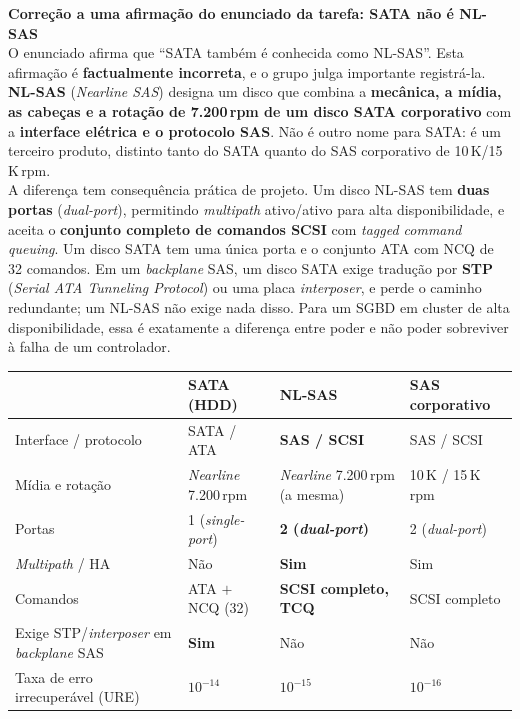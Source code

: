 \documentclass[11pt,a4paper]{article}
\newcommand{\correcao}[2]{%
  \begin{center}\begin{minipage}{0.96\textwidth}
  \colorbox{fundo}{\begin{minipage}{\dimexpr\linewidth-2\fboxsep}
  \vspace{3pt}\textbf{\color{laranja}#1}\\[2pt]\small #2\vspace{4pt}
  \end{minipage}}\end{minipage}\end{center}}
\begin{document}
\correcao{Correção a uma afirmação do enunciado da tarefa: SATA \textbf{não} é NL-SAS}{%
O enunciado afirma que ``SATA também é conhecida como NL-SAS''. Esta afirmação é
\textbf{factualmente incorreta}, e o grupo julga importante registrá-la.\\[4pt]
\textbf{NL-SAS} (\emph{Nearline SAS}) designa um disco que combina a \textbf{mecânica, a
mídia, as cabeças e a rotação de 7.200\,rpm de um disco SATA corporativo} com a
\textbf{interface elétrica e o protocolo SAS}. Não é outro nome para SATA: é um terceiro
produto, distinto tanto do SATA quanto do SAS corporativo de 10\,K/15\,K\,rpm.\\[4pt]
A diferença tem consequência prática de projeto. Um disco NL-SAS tem \textbf{duas portas}
(\emph{dual-port}), permitindo \emph{multipath} ativo/ativo para alta disponibilidade, e
aceita o \textbf{conjunto completo de comandos SCSI} com \emph{tagged command queuing}. Um
disco SATA tem uma única porta e o conjunto ATA com NCQ de 32 comandos. Em um
\emph{backplane} SAS, um disco SATA exige tradução por \textbf{STP} (\emph{Serial ATA
Tunneling Protocol}) ou uma placa \emph{interposer}, e perde o caminho redundante; um
NL-SAS não exige nada disso. Para um SGBD em cluster de alta disponibilidade, essa é
exatamente a diferença entre poder e não poder sobreviver à falha de um controlador.}

\begin{center}\small
\begin{tabular}{@{}p{3.6cm}p{3.5cm}p{3.5cm}p{3.5cm}@{}}
\toprule
 & \textbf{SATA (HDD)} & \textbf{NL-SAS} & \textbf{SAS corporativo} \\
\midrule
Interface / protocolo & SATA / ATA & \textbf{SAS / SCSI} & SAS / SCSI \\
Mídia e rotação & \emph{Nearline} 7.200\,rpm & \emph{Nearline} 7.200\,rpm (a mesma) & 10\,K / 15\,K\,rpm \\
Portas & 1 (\emph{single-port}) & \textbf{2 (\emph{dual-port})} & 2 (\emph{dual-port}) \\
\emph{Multipath} / HA & Não & \textbf{Sim} & Sim \\
Comandos & ATA $+$ NCQ (32) & \textbf{SCSI completo, TCQ} & SCSI completo \\
Exige STP/\emph{interposer} em \emph{backplane} SAS & \textbf{Sim} & Não & Não \\
Taxa de erro irrecuperável (URE) & $10^{-14}$ & $10^{-15}$ & $10^{-16}$ \\
\bottomrule
\end{tabular}
\end{center}
\end{document}
